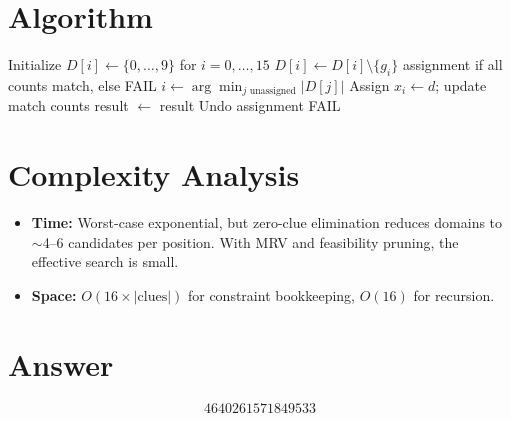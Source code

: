 \documentclass[12pt]{article}
\begin{document}
\section{Algorithm}

\begin{algorithmic}[1]
    \State Initialize $D[i] \gets \{0,\ldots,9\}$ for $i = 0, \ldots, 15$
            \State $D[i] \gets D[i] \setminus \{g_i\}$
        \EndFor
    \EndFor
    \State \Return {}
\EndFunction
\Statex
{}
        \State \Return assignment if all counts match, else FAIL
    \EndIf
    \State $i \gets \arg\min_{j \text{ unassigned}} |D[j]|$ 
        \State Assign $x_i \gets d$; update match counts
            \State result $\gets$ 
             \Return result \EndIf
        \EndIf
        \State Undo assignment
    \EndFor
    \State \Return FAIL
\EndFunction
\end{algorithmic}

\section{Complexity Analysis}

\begin{itemize}
    \item \textbf{Time:} Worst-case exponential, but zero-clue elimination reduces domains to $\sim$4--6 candidates per position. With MRV and feasibility pruning, the effective search is small.
    \item \textbf{Space:} $O(16 \times |\text{clues}|)$ for constraint bookkeeping, $O(16)$ for recursion.
\end{itemize}

\section{Answer}

\[
\boxed{4640261571849533}
\]
\end{document}
